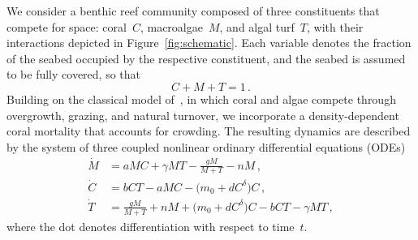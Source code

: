 \documentclass[reqno,11pt]{amsart}
\numberwithin{equation}{section}
\begin{document}
We consider a benthic reef community composed of three constituents that compete for space: coral~$C$, macroalgae~$M$, and algal turf~$T$, with their interactions depicted in Figure~\ref{fig:schematic}. Each variable denotes the fraction of the seabed occupied by the respective constituent, and the seabed is assumed to be fully covered, so that
\begin{equation}\label{cover}
C+M+T=1\,.
\end{equation}
Building on the classical model of~\cite{Mum07}, in which coral and algae compete through overgrowth, grazing, and natural turnover, we incorporate a density-dependent coral mortality that accounts for crowding. The resulting dynamics are described by the system of three coupled nonlinear ordinary differential equations (ODEs)
\begin{subequations}\label{CMT}
\begin{align}
\dot M &= a MC + \gamma MT - \frac{g M}{M+T} - n M\,, \label{CMT1}\\
\dot C &= bCT - aMC - \big(m_0 + d C^{\delta}\big)C\,, \label{CMT2}\\
\dot T &= \frac{g M}{M+T} + n M + \big(m_0 + dC^{\delta}\big)C - b CT - \gamma MT\,, \label{CMT3}
\end{align}
\end{subequations}
where the dot denotes differentiation with respect to time~$t$.
\end{document}
